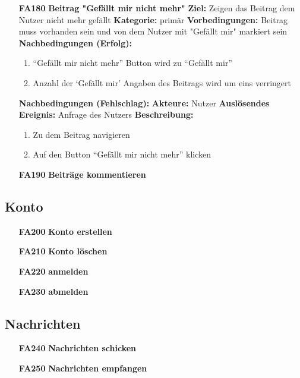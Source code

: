 \documentclass[parskip=full]{scrartcl}
\begin{document}
\begin{itemize}[nosep]
					
						\item[\textbf{FA180}]\textbf{Beitrag "Gefällt mir nicht mehr"}
						\newline \textbf{Ziel:} Zeigen das Beitrag dem Nutzer nicht mehr gefällt
						\newline \textbf{Kategorie:} primär
						\newline \textbf{Vorbedingungen:} Beitrag muss vorhanden sein und von dem Nutzer mit "Gefällt mir" markiert sein
						\newline \textbf{Nachbedingungen (Erfolg):} 
						\begin{enumerate}[nosep]
							\item “Gefällt mir nicht mehr” Button wird zu “Gefällt mir”
							\item Anzahl der ‘Gefällt mir’ Angaben des Beitrags wird um eins  verringert 
						\end{enumerate}
						\textbf{Nachbedingungen (Fehlschlag):}
						\newline \textbf{Akteure:} Nutzer
						\newline \textbf{Auslösendes Ereignis:} Anfrage des Nutzers
						\newline \textbf{Beschreibung:}
						\begin{enumerate}[nosep]
							\item Zu dem Beitrag navigieren
							\item Auf den Button “Gefällt mir nicht mehr” klicken\\
						\end{enumerate}
						
				
			\item[\textbf{FA190}]\textbf{Beiträge kommentieren}
			
		\end{itemize}
		
		\subsection{Konto}
		\begin{itemize}[nosep]
			\item[\textbf{FA200}]\textbf{Konto erstellen}
			\item[\textbf{FA210}]\textbf{Konto löschen}
			\item[\textbf{FA220}]\textbf{anmelden}
			\item[\textbf{FA230}]\textbf{abmelden}
		\end{itemize}
		
		\subsection{Nachrichten}
		\begin{itemize}[nosep]
			\item[\textbf{FA240}]\textbf{Nachrichten schicken}
			\item[\textbf{FA250}]\textbf{ Nachrichten empfangen}
		\end{itemize}
		
\end{document}
